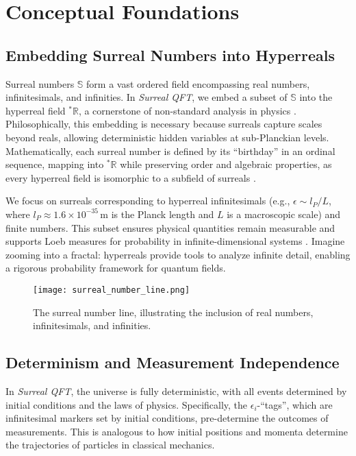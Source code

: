 \documentclass{article}
\begin{document}
\section{Conceptual Foundations}
\subsection{Embedding Surreal Numbers into Hyperreals}
Surreal numbers \(\mathbb{S}\) form a vast ordered field encompassing real numbers, infinitesimals, and infinities. In \textit{Surreal QFT}, we embed a subset of \(\mathbb{S}\) into the hyperreal field \({}^*\mathbb{R}\), a cornerstone of non-standard analysis in physics \cite{Goldblatt1998}. Philosophically, this embedding is necessary because surreals capture scales beyond reals, allowing deterministic hidden variables at sub-Planckian levels. Mathematically, each surreal number is defined by its ``birthday'' in an ordinal sequence, mapping into \({}^*\mathbb{R}\) while preserving order and algebraic properties, as every hyperreal field is isomorphic to a subfield of surreals \cite{Ehrlich2012}.

We focus on surreals corresponding to hyperreal infinitesimals (e.g., \(\epsilon \sim l_P / L\), where \(l_P \approx 1.6 \times 10^{-35} \, \text{m}\) is the Planck length and \(L\) is a macroscopic scale) and finite numbers. This subset ensures physical quantities remain measurable and supports Loeb measures for probability in infinite-dimensional systems \cite{Albeverio1986}. Imagine zooming into a fractal: hyperreals provide tools to analyze infinite detail, enabling a rigorous probability framework for quantum fields.

\begin{figure}[htbp]
    \centering
    \texttt{[image: surreal\_number\_line.png]}
    \caption{The surreal number line, illustrating the inclusion of real numbers, infinitesimals, and infinities.}
    \label{fig:surreal_line}
\end{figure}

\subsection{Determinism and Measurement Independence}
In \textit{Surreal QFT}, the universe is fully deterministic, with all events determined by initial conditions and the laws of physics. Specifically, the \(\epsilon_i\)-``tags'', which are infinitesimal markers set by initial conditions, pre-determine the outcomes of measurements. This is analogous to how initial positions and momenta determine the trajectories of particles in classical mechanics.
\end{document}
